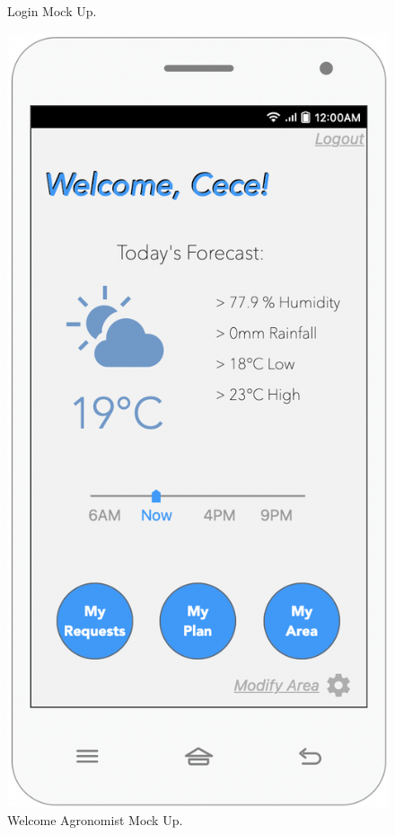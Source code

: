 \begin{multicols}{3}
\begin{figure}[H]
 \caption{\label{fig:mock_login}Login Mock Up.}
 \end{figure}
 
 
\begin{figure}[H]
 \centering
\includegraphics[scale=0.35]{../images_diagrams/mock_ups/welcomeagro100.png}
 \caption{\label{fig:mock_agronomist}Welcome Agronomist Mock Up.}
 \end{figure}
 

\end{multicols}
